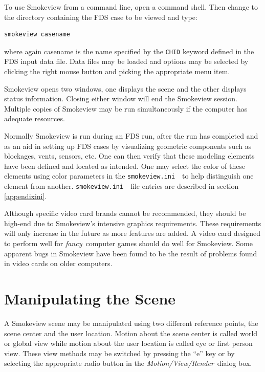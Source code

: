 \documentclass[11pt,twoside]{book}
\newcommand{\svini}{{\tt smokeview.ini}\ }
\begin{document}
To use Smokeview from a command line, open a command shell. Then
change to the directory containing the FDS case to be viewed and
type:
\begin{lstlisting}
smokeview casename
\end{lstlisting}
where again casename is the name specified by the {\tt CHID}
keyword defined in the FDS input data file. Data files may be
loaded and options may be selected by clicking the right mouse
button and picking the appropriate menu item.


Smokeview opens two windows, one displays the scene and the other
displays status information. Closing either window will end the
Smokeview session.  Multiple copies of Smokeview may be run
simultaneously if the computer has adequate resources.

Normally Smokeview is run during an FDS run, after the run has
completed and as an aid in setting up FDS cases by visualizing
geometric components such as blockages, vents, sensors, etc. One
can then verify that these modeling elements have been defined and
located as intended. One may select the color of these elements
using color parameters in the \svini\ to help distinguish one
element from another. \svini\ file entries are described in
section \ref{appendixini}.

Although specific video card brands cannot be recommended, they
should be high-end due to Smokeview's intensive graphics
requirements. These requirements will only increase in the future
as more features are added.  A video card designed to perform well
for {\em fancy}\ computer games should do well for Smokeview. Some
apparent bugs in Smokeview have been found to be the result of
problems found in video cards on older computers.


\chapter{Manipulating the Scene}

A Smokeview scene may be manipulated using two different reference
points, the scene center and the user location. Motion about the
scene center is called world or global view while motion about the
user location is called eye or first person view. These view
methods may be switched by pressing the ``e'' key or by selecting
the appropriate radio button in the {\em Motion/View/Render}\
dialog box.
\end{document}
